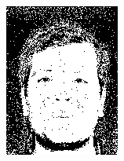\begin{figure}[h]
\begin{subfigure}[b]{0.18\textwidth}
         \includegraphics[width=\textwidth]{images/results/base_st/dd109.color.d3_bayes.png}
     \end{subfigure}
    \hfill
     \begin{subfigure}[b]{0.18\textwidth}
         \centering

\end{subfigure}
\end{figure}

